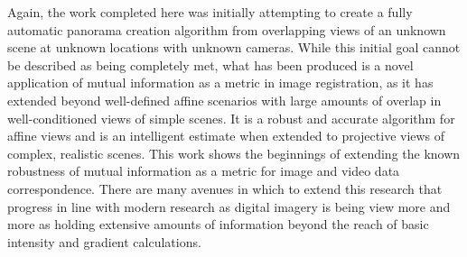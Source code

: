 %
%
%
%
%
%

%
%
%



Again, the work completed here was initially attempting to create a fully automatic panorama creation algorithm from overlapping views of an unknown scene at unknown locations with unknown cameras. While this initial goal cannot be described as being completely met, what has been produced is a novel application of mutual information as a metric in image registration, as it has extended beyond well-defined affine scenarios with large amounts of overlap in well-conditioned views of simple scenes. It is a robust and accurate algorithm for affine views and is an intelligent estimate when extended to projective views of complex, realistic scenes. This work shows the beginnings of extending the known robustness of mutual information as a metric for image and video data correspondence. There are many avenues in which to extend this research that progress in line with modern research as digital imagery is being view more and more as holding extensive amounts of information beyond the reach of basic intensity and gradient calculations.


